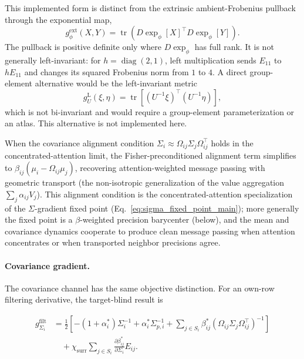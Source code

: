 \documentclass[twoside,11pt]{article}
\begin{document}
This implemented form is distinct from the extrinsic ambient-Frobenius pullback through the exponential map,
\begin{equation}
g_{\phi}^{\mathrm{ext}}(X,Y)
=\operatorname{tr}\left(D\exp_{\phi}[X]^\top D\exp_{\phi}[Y]\right).
\label{eq:extrinsic_exp_pullback}
\end{equation}
The pullback is positive definite only where $D\exp_{\phi}$ has full rank. It is not generally left-invariant: for $h=\operatorname{diag}(2,1)$, left multiplication sends $E_{11}$ to $hE_{11}$ and changes its squared Frobenius norm from $1$ to $4$. A direct group-element alternative would be the left-invariant metric
\begin{equation}
g_U^{\mathrm{L}}(\xi,\eta)
=\operatorname{tr}\left[(U^{-1}\xi)^\top(U^{-1}\eta)\right],
\label{eq:left_invariant_group_metric}
\end{equation}
which is not bi-invariant and would require a group-element parameterization or an atlas. This alternative is not implemented here.

When the covariance alignment condition $\Sigma_i \approx \Omega_{ij}\Sigma_j\Omega_{ij}^\top$ holds in the concentrated-attention limit, the Fisher-preconditioned alignment term simplifies to $\beta_{ij}(\mu_i - \Omega_{ij}\mu_j)$, recovering attention-weighted message passing with geometric transport (the non-isotropic generalization of the value aggregation $\sum_j \alpha_{ij} V_j$). This alignment condition is the concentrated-attention specialization of the $\Sigma$-gradient fixed point (Eq.~\ref{eq:sigma_fixed_point_main}); more generally the fixed point is a $\beta$-weighted precision barycenter (below), and the mean and covariance dynamics cooperate to produce clean message passing when attention concentrates or when transported neighbor precisions agree.

\paragraph{Covariance gradient.}

The covariance channel has the same objective distinction. For an own-row filtering derivative, the target-blind result is

\begin{equation}
\boxed{
\begin{aligned}
g_{\Sigma_i}^{\mathrm{filt}}
&= \frac{1}{2}
\left[
-(1+\alpha_i^*) \Sigma_i^{-1}
+ \alpha_i^* \Sigma_{p,i}^{-1}
+ \sum_{j\in S_i} \beta_{ij}^*
(\Omega_{ij}\Sigma_j\Omega_{ij}^\top)^{-1}
\right] \\
&\quad+\chi_{\mathrm{surr}}
\sum_{j\in S_i}
\frac{\partial\beta_{ij}^*}{\partial\Sigma_i}E_{ij}.
\end{aligned}
}
\label{eq:Sigma_gradient_main}
\end{equation}
\end{document}
